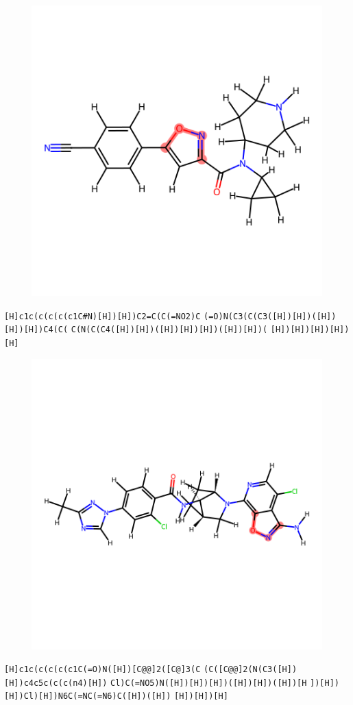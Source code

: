 \documentclass{article}
\begin{document}
\begin{figure}[ht]
\centering
    \includegraphics{mol232.png}
\end{figure}
\verb|[H]c1c(c(c(c(c1C#N)[H])[H])C2=C(C(=NO2)C| \verb|(=O)N(C3(C(C3([H])[H])([H])[H])[H])C4(C(| \verb|C(N(C(C4([H])[H])([H])[H])[H])([H])[H])(| \verb|[H])[H])[H])[H])[H]|

\begin{figure}[ht]
\centering
    \includegraphics{mol233.png}
\end{figure}
\verb|[H]c1c(c(c(c(c1C(=O)N([H])[C@@]2([C@]3(C| \verb|(C([C@@]2(N(C3([H])[H])c4c5c(c(c(n4)[H])| \verb|Cl)C(=NO5)N([H])[H])[H])([H])[H])([H])[H| \verb|])[H])[H])Cl)[H])N6C(=NC(=N6)C([H])([H])| \verb|[H])[H])[H]|
\end{document}
